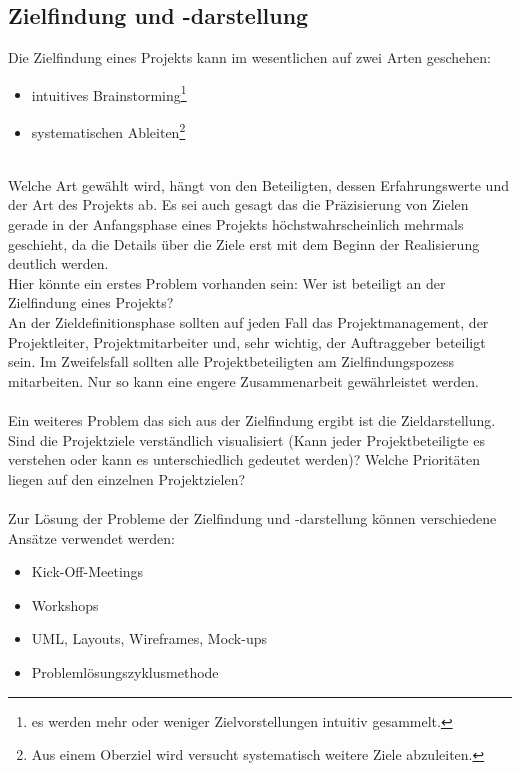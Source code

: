 \documentclass[12pt]{scrartcl}
\begin{document}
\subsection{Zielfindung und -darstellung}
Die Zielfindung eines Projekts kann im wesentlichen auf zwei Arten geschehen:
\begin{itemize}
    \item{intuitives Brainstorming\footnote{es werden mehr oder weniger Zielvorstellungen intuitiv gesammelt.}}
    \item{systematischen Ableiten\footnote{Aus einem Oberziel wird versucht systematisch weitere Ziele abzuleiten.}}
\end{itemize}
\ \\
Welche Art gewählt wird, hängt von den Beteiligten, dessen Erfahrungswerte und der Art des Projekts ab. Es sei auch gesagt das die Präzisierung von Zielen gerade in der Anfangsphase eines Projekts höchstwahrscheinlich mehrmals geschieht, da die Details über die Ziele erst mit dem Beginn der Realisierung deutlich werden. \\
Hier könnte ein erstes Problem vorhanden sein: Wer ist beteiligt an der Zielfindung eines Projekts?\\ 
An der Zieldefinitionsphase sollten auf jeden Fall das Projektmanagement, der Projektleiter, Projektmitarbeiter und, sehr wichtig, der Auftraggeber beteiligt sein. Im Zweifelsfall sollten alle Projektbeteiligten am Zielfindungspozess mitarbeiten. Nur so kann eine engere Zusammenarbeit gewährleistet werden.\\
\\
Ein weiteres Problem das sich aus der Zielfindung ergibt ist die Zieldarstellung. Sind die Projektziele verständlich visualisiert (Kann jeder Projektbeteiligte es verstehen oder kann es unterschiedlich gedeutet werden)? Welche Prioritäten liegen auf den einzelnen Projektzielen? \\
\\
Zur Lösung der Probleme der Zielfindung und -darstellung können verschiedene Ansätze verwendet werden:
\begin{itemize}
    \item{Kick-Off-Meetings}
    
    \item{Workshops}
    
    \item{UML, Layouts, Wireframes, Mock-ups}
    
    \item{Problemlösungszyklusmethode}
    
\end{itemize}
\end{document}
